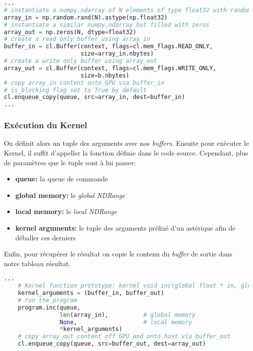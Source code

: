\begin{lstlisting}[language=Python]
...
# instantiate a numpy.ndarray of N elements of type float32 with random values
array_in = np.random.rand(N).astype(np.float32)
# instantiate a similar numpy.ndarray but filled with zeros
array_out = np.zeros(N, dtype=float32)
# create a read only buffer using array_in
buffer_in = cl.Buffer(context, flags=cl.mem_flags.READ_ONLY,
                      size=array_in.nbytes)
# create a write only buffer using array_out
array_out = cl.Buffer(context, flags=cl.mem_flags.WRITE_ONLY,
                      size=b.nbytes)
# copy array_in content onto GPU via buffer_in
# is_blocking flag set to True by default
cl.enqueue_copy(queue, src=array_in, dest=buffer_in)    
...
\end{lstlisting}


\subsubsection{Exécution du Kernel}\label{sec:execution_kernel}

On définit alors un tuple des arguments avec nos \textit{buffers}.
Ensuite pour exécuter le Kernel, il suffit d'appeller la fonction
définie dans le code source. Cependant, plus de paramètres que le tuple sont 
à lui passer:
\begin{itemize}
    \item \textbf{queue:} la queue de commande
    \item \textbf{global memory:} le \textit{global NDRange}
    \item \textbf{local memory:} le \textit{local NDRange}
    \item \textbf{kernel arguments:} le tuple des arguments préfixé d'un 
        astérique afin de déballer ces derniers
\end{itemize}
Enfin, pour récupérer le résultat on copie le contenu du \textit{buffer} de 
sortie dans notre tableau résultat.

\begin{lstlisting}[language=python]
    ...
    # Kernel function prototype: kernel void inc(global float * in, global float * out)
    kernel_arguments = (buffer_in, buffer_out)
    # run the program
    program.inc(queue,                  
                len(array_in),          # global memory 
                None,                   # local memory
                *kernel_arguments)
    # copy array_out content off GPU and onto host via buffer_out
    cl.enqueue_copy(queue, src=buffer_out, dest=array_out)
\end{lstlisting}
